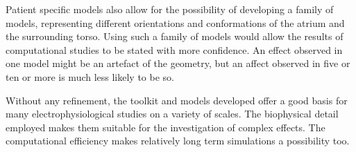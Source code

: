 Patient specific models also allow for the possibility of developing a family of models,
representing different orientations and conformations of the atrium and the
surrounding torso.
Using such a family of models would allow the results of computational studies
to be stated with more confidence.
An effect observed in one model might be an artefact of the geometry, but an
affect observed in five or ten or more is much less likely to be so.

Without any refinement, the toolkit and models developed offer a good basis for
many electrophysiological studies on a variety of scales.
The biophysical detail employed makes them suitable for the investigation of
complex effects.
The computational efficiency makes relatively long term simulations a
possibility too.
